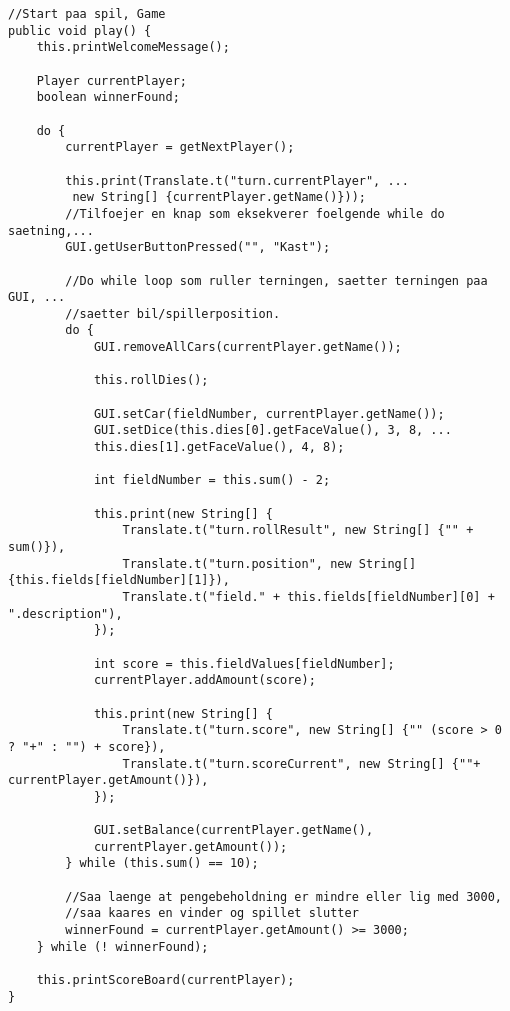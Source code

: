 \begin{lstlisting}
//Start paa spil, Game
public void play() {
    this.printWelcomeMessage();

    Player currentPlayer;
    boolean winnerFound;

    do {
        currentPlayer = getNextPlayer();

        this.print(Translate.t("turn.currentPlayer", ...
         new String[] {currentPlayer.getName()}));
        //Tilfoejer en knap som eksekverer foelgende while do saetning,...
        GUI.getUserButtonPressed("", "Kast");
        
        //Do while loop som ruller terningen, saetter terningen paa GUI, ...
        //saetter bil/spillerposition.
        do {
            GUI.removeAllCars(currentPlayer.getName());

            this.rollDies();

            GUI.setCar(fieldNumber, currentPlayer.getName());
            GUI.setDice(this.dies[0].getFaceValue(), 3, 8, ...
            this.dies[1].getFaceValue(), 4, 8);

            int fieldNumber = this.sum() - 2;
             
            this.print(new String[] {
                Translate.t("turn.rollResult", new String[] {"" + sum()}),
                Translate.t("turn.position", new String[] {this.fields[fieldNumber][1]}),
                Translate.t("field." + this.fields[fieldNumber][0] + ".description"),
            });

            int score = this.fieldValues[fieldNumber];
            currentPlayer.addAmount(score);

            this.print(new String[] {
                Translate.t("turn.score", new String[] {"" (score > 0 ? "+" : "") + score}),
                Translate.t("turn.scoreCurrent", new String[] {""+ currentPlayer.getAmount()}),
            });

            GUI.setBalance(currentPlayer.getName(),
            currentPlayer.getAmount());
        } while (this.sum() == 10);
        
        //Saa laenge at pengebeholdning er mindre eller lig med 3000,
        //saa kaares en vinder og spillet slutter
        winnerFound = currentPlayer.getAmount() >= 3000;
    } while (! winnerFound);

    this.printScoreBoard(currentPlayer);
}
\end{lstlisting}
\vspace{2ex}

